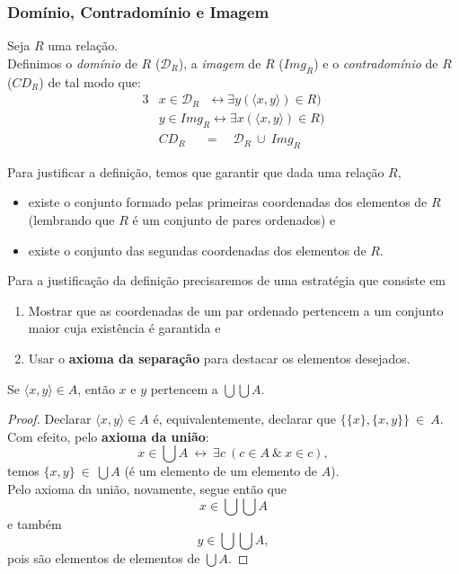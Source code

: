       \subsubsection{Domínio, Contradomínio e Imagem}
         \begin{definition}
            Seja $R$ uma relação.\\
            Definimos o \textit{domínio} de $R$ ($\mathcal{D}_{R}$), a \textit{imagem} de $R$ ($\mathit{Img}_{R}$) e o \textit{contradomínio} de $R$ ($\mathit{CD}_{R}$) de tal modo que:
            \begin{alignat*}{3}
               & x \in \mathcal{D}_{R}\ \ \ \leftrightarrow \exists y (\langle x, y \rangle) \in R)\\
               & y \in \mathit{Img}_{R} \leftrightarrow \exists x (\langle x, y \rangle) \in R)\\
               & \mathit{CD}_{R}\quad \ \ =\quad \mathcal{D}_{R}\ \cup\ \mathit{Img}_{R}
            \end{alignat*}
         \end{definition}
         Para justificar a definição, temos que garantir que dada uma relação $R$,
         \begin{itemize}
            \item existe o conjunto formado pelas primeiras coordenadas dos elementos de $R$ (lembrando que $R$ é um conjunto de pares ordenados) e
            \item existe o conjunto das segundas coordenadas dos elementos de $R.$
         \end{itemize}
         Para a justificação da definição precisaremos de uma estratégia que consiste em
         \begin{enumerate}
            \item Mostrar que as coordenadas de um par ordenado pertencem a um conjunto maior cuja existência é garantida e
            \item Usar o \textbf{axioma da separação} para destacar os elementos desejados.
         \end{enumerate}
         \begin{lemma}
            Se $\langle x, y \rangle \in A$, então $x$ e $y$ pertencem a $\bigcup \bigcup A.$
            \begin{proof}
               Declarar $\langle x, y \rangle \in A$ é, equivalentemente, declarar que $\{\{x\},\{x,y\}\}\ \in\ A$.\\
               Com efeito, pelo \textbf{axioma da união}:
               $$x \in \bigcup A\ \leftrightarrow\ \exists c\ (c \in A\ \&\ x \in c),$$
               temos $\{x,y\}\ \in\ \bigcup A$ (é um elemento de um elemento de $A$).\\
               Pelo axioma da união, novamente, segue então que $$x \in \bigcup \bigcup A$$
               e também
               $$y \in \bigcup \bigcup A,$$
               pois são elementos de elementos de $\bigcup A.$
            \end{proof}
         \end{lemma}          
